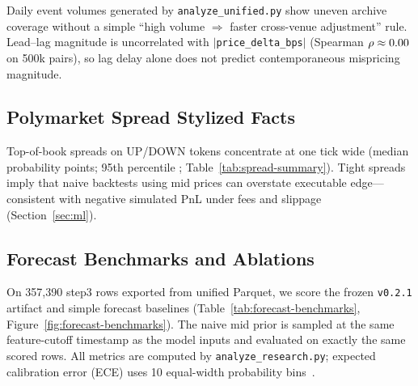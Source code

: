 Daily event volumes generated by \texttt{analyze\_unified.py} show uneven
archive coverage without a simple ``high volume $\Rightarrow$ faster
cross-venue adjustment'' rule.
Lead--lag magnitude is uncorrelated with $|$\texttt{price\_delta\_bps}$|$
(Spearman $\rho \approx 0.00{}$ on 500k pairs), so lag delay
alone does not predict contemporaneous mispricing magnitude.

\subsection{Polymarket Spread Stylized Facts}
\label{sec:insights-spread}

Top-of-book spreads on UP/DOWN tokens concentrate at one tick wide
(median \OpenMarketSpreadMedian{} probability points; 95th percentile
\OpenMarketSpreadPNinetyFive{}; Table~\ref{tab:spread-summary}). Tight spreads
imply that naive backtests using mid prices can overstate executable edge---consistent
with negative simulated PnL under fees and slippage (Section~\ref{sec:ml}).

\subsection{Forecast Benchmarks and Ablations}
\label{sec:insights-forecast}

On 357{,}390 step3 rows exported from unified Parquet, we score the frozen
\texttt{v0.2.1} artifact and simple forecast baselines
(Table~\ref{tab:forecast-benchmarks}, Figure~\ref{fig:forecast-benchmarks}).
The naive mid prior is sampled at the same feature-cutoff timestamp as the
model inputs and evaluated on exactly the same scored rows.
All metrics are computed by \texttt{analyze\_research.py}; expected calibration
error (ECE) uses 10 equal-width probability bins~\cite{guo2017calibration}.

